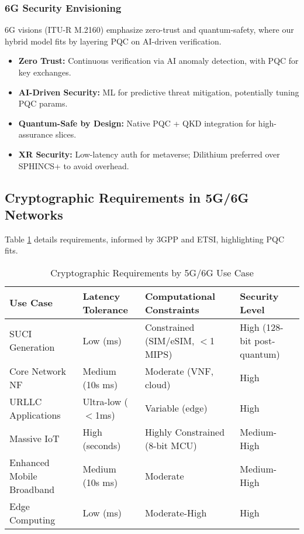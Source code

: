 \documentclass[11pt,a4paper]{article}
\begin{document}
\subsubsection{6G Security Envisioning}

6G visions (ITU-R M.2160) emphasize zero-trust and quantum-safety, where our hybrid model fits by layering PQC on AI-driven verification.

\begin{itemize}
    \item \textbf{Zero Trust:} Continuous verification via AI anomaly detection, with PQC for key exchanges.
    
    \item \textbf{AI-Driven Security:} ML for predictive threat mitigation, potentially tuning PQC params.
    
    \item \textbf{Quantum-Safe by Design:} Native PQC + QKD integration for high-assurance slices.
    
    \item \textbf{XR Security:} Low-latency auth for metaverse; Dilithium preferred over SPHINCS+ to avoid overhead.
\end{itemize}

\subsection{Cryptographic Requirements in 5G/6G Networks}

Table \ref{tab:crypto_requirements} details requirements, informed by 3GPP and ETSI, highlighting PQC fits.

\begin{table}[H]
\centering
\caption{Cryptographic Requirements by 5G/6G Use Case}
\label{tab:crypto_requirements}
\begin{tabular}{|p{3cm}|p{3cm}|p{3cm}|p{3cm}|}
\hline
\textbf{Use Case} & \textbf{Latency Tolerance} & \textbf{Computational Constraints} & \textbf{Security Level} \\
\hline
SUCI Generation & Low (ms) & Constrained (SIM/eSIM, $<$1 MIPS) & High (128-bit post-quantum) \\
\hline
Core Network NF & Medium (10s ms) & Moderate (VNF, cloud) & High \\
\hline
URLLC Applications & Ultra-low ($<$1ms) & Variable (edge) & High \\
\hline
Massive IoT & High (seconds) & Highly Constrained (8-bit MCU) & Medium-High \\
\hline
Enhanced Mobile Broadband & Medium (10s ms) & Moderate & Medium-High \\
\hline
Edge Computing & Low (ms) & Moderate-High & High \\
\hline
\end{tabular}
\end{table}
\end{document}

